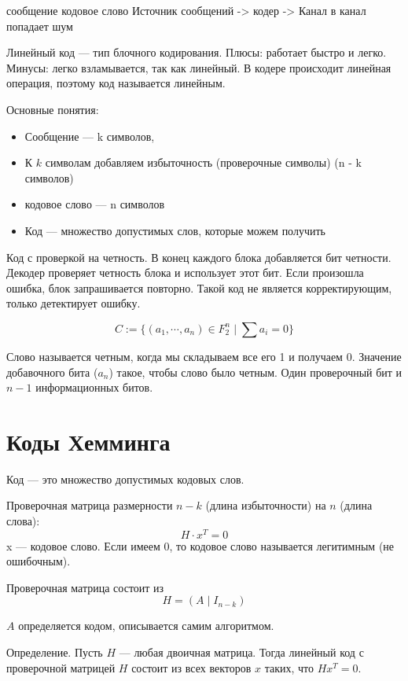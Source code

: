{                   сообщение  кодовое слово
Источник сообщений -> кодер -> Канал
                               в канал попадает шум

Линейный код --- тип блочного кодирования. Плюсы: работает быстро и легко.
Минусы: легко взламывается, так как линейный. В кодере происходит линейная
операция, поэтому код называется линейным.

Основные понятия:
\begin{itemize}
    \item  Сообщение --- k символов,

    \item К $k$ символам добавляем избыточность (проверочные символы) (n - k символов)

    \item кодовое слово --- n символов

    \item Код --- множество допустимых слов, которые можем получить
\end{itemize}

Код с проверкой на четность. В конец каждого блока добавляется бит четности.
Декодер проверяет четность блока и использует этот бит. Если произошла ошибка,
блок запрашивается повторно. Такой код не является корректирующим, только
детектирует ошибку.

\[
    C := \{(a_1, \cdots, a_n) \in F^n_2 \mid \sum a_i = 0\}
\]

Слово называется четным, когда мы складываем все его 1 и получаем 0. Значение
добавочного бита ($a_n$) такое, чтобы слово было четным. Один проверочный бит и
$n-1$ информационных битов.

\section{Коды Хемминга}

Код --- это множество допустимых кодовых слов.

Проверочная матрица размерности $n-k$ (длина избыточности) на $n$ (длина слова):
\[
    H \cdot x^T = 0
\]
x --- кодовое слово. Если имеем 0, то кодовое слово называется легитимным (не
ошибочным).

Проверочная матрица состоит из 
\[
    H = ( A \mid I_{n-k})
\]

$A$ определяется кодом, описывается самим алгоритмом.

Определение. Пусть $H$ --- любая двоичная матрица. Тогда линейный код с
проверочной матрицей $H$ состоит из всех векторов $x$ таких, что $Hx^T = 0$.

}
